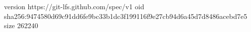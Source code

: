 version https://git-lfs.github.com/spec/v1
oid sha256:9474580d69c91dd6fe9bc33b1dc3f199116f9e27cb94d6a45d7d8486acebd7e5
size 262240
